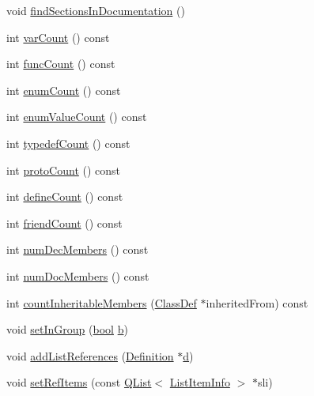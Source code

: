 \begin{DoxyCompactItemize}
\item 
void \hyperlink{class_member_group_a4aa10086246b592da7042c7431755374}{find\+Sections\+In\+Documentation} ()
\item 
int \hyperlink{class_member_group_a61d6cf552be138aaa83a245520ceb8af}{var\+Count} () const 
\item 
int \hyperlink{class_member_group_ad2ef3cfd54911c49829307ad729a18cc}{func\+Count} () const 
\item 
int \hyperlink{class_member_group_afc97f0f1bc450ea7aee2745972a207bd}{enum\+Count} () const 
\item 
int \hyperlink{class_member_group_aab512b1dd158937dcd8ed67ec8d7f6be}{enum\+Value\+Count} () const 
\item 
int \hyperlink{class_member_group_ac19cc4f463bd38813eaf71c79ff61a9d}{typedef\+Count} () const 
\item 
int \hyperlink{class_member_group_a4a736f376816e74ad3594287b9d49960}{proto\+Count} () const 
\item 
int \hyperlink{class_member_group_acfdba5249d8907b15d1e44e60e7244e3}{define\+Count} () const 
\item 
int \hyperlink{class_member_group_ad2400877388d89a7297b03370461ebc1}{friend\+Count} () const 
\item 
int \hyperlink{class_member_group_a301fbeb73ffccd05c15b30d0f5bad66f}{num\+Dec\+Members} () const 
\item 
int \hyperlink{class_member_group_a183ab4f5dfa021b35384ad45e0690095}{num\+Doc\+Members} () const 
\item 
int \hyperlink{class_member_group_ad2d61b4c2cf7a8f5750a42ace004acf5}{count\+Inheritable\+Members} (\hyperlink{class_class_def}{Class\+Def} $\ast$inherited\+From) const 
\item 
void \hyperlink{class_member_group_a544526a0c59d95f8ce1af3b44d252861}{set\+In\+Group} (\hyperlink{qglobal_8h_a1062901a7428fdd9c7f180f5e01ea056}{bool} \hyperlink{060__command__switch_8tcl_a68bdb74c144118d936931c46f75d4b3e}{b})
\item 
void \hyperlink{class_member_group_a847857b04f0977eef02f896db366f18b}{add\+List\+References} (\hyperlink{class_definition}{Definition} $\ast$\hyperlink{060__command__switch_8tcl_af43f4b1f0064a33b2d662af9f06d3a00}{d})
\item 
void \hyperlink{class_member_group_af56ab646e46a0cd646c06dd9b76cffd2}{set\+Ref\+Items} (const \hyperlink{class_q_list}{Q\+List}$<$ \hyperlink{struct_list_item_info}{List\+Item\+Info} $>$ $\ast$sli)
\item 

\end{DoxyCompactItemize}
